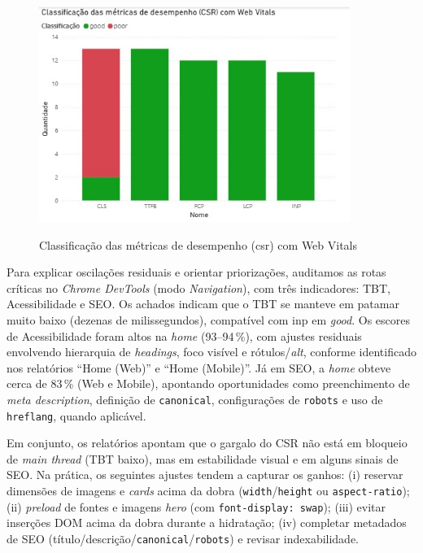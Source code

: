 {\begin{figure}[h]
\centering
\caption{Classificação das métricas de desempenho (\acrshort{csr}) com Web Vitals}
\includegraphics[width=0.9\textwidth]{media/metricas_csr_web_vitals.jpeg}
\label{fig:csr-webvitals}
\end{figure}

Para explicar oscilações residuais e orientar priorizações, auditamos as rotas críticas no \emph{Chrome DevTools} (modo \emph{Navigation}), com três indicadores: TBT, Acessibilidade e SEO. Os achados indicam que o TBT se manteve em patamar muito baixo (dezenas de milissegundos), compatível com \acrshort{inp} em \textit{good}. Os escores de Acessibilidade foram altos na \emph{home} (93--94\,\%), com ajustes residuais envolvendo hierarquia de \emph{headings}, foco visível e rótulos/\textit{alt}, conforme identificado nos relatórios “Home (Web)” e “Home (Mobile)”. Já em SEO, a \emph{home} obteve cerca de 83\,\% (Web e Mobile), apontando oportunidades como preenchimento de \emph{meta description}, definição de \texttt{canonical}, configurações de \texttt{robots} e uso de \texttt{hreflang}, quando aplicável.

Em conjunto, os relatórios apontam que o gargalo do CSR não está em bloqueio de \emph{main thread} (TBT baixo), mas em estabilidade visual e em alguns sinais de SEO. Na prática, os seguintes ajustes tendem a capturar os ganhos: (i) reservar dimensões de imagens e \emph{cards} acima da dobra (\texttt{width}/\texttt{height} ou \texttt{aspect-ratio}); (ii) \emph{preload} de fontes e imagens \emph{hero} (com \texttt{font-display: swap}); (iii) evitar inserções DOM acima da dobra durante a hidratação; (iv) completar metadados de SEO (título/descrição/\texttt{canonical}/\texttt{robots}) e revisar indexabilidade.

}
